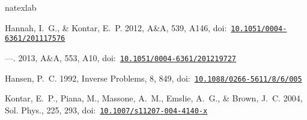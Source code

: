 \documentclass[12pt,a4paper]{article}
\newcommand{\aap}{A\&A}
\newcommand{\solphys}{Sol. Phys.}
\begin{document}
% 
% 	
\begin{thebibliography}{}
\expandafter\ifx\csname natexlab\endcsname\relax\def\natexlab#1{#1}\fi
\providecommand{\url}[1]{\href{#1}{#1}}
\providecommand{\dodoi}[1]{doi:~\href{http://doi.org/#1}{\nolinkurl{#1}}}
\providecommand{\doeprint}[1]{\href{http://ascl.net/#1}{\nolinkurl{http://ascl.net/#1}}}
\providecommand{\doarXiv}[1]{\href{https://arxiv.org/abs/#1}{\nolinkurl{https://arxiv.org/abs/#1}}}

{Hannah}, I.~G., \& {Kontar}, E.~P. 2012, \aap, 539, A146,
  \dodoi{10.1051/0004-6361/201117576}

---. 2013, \aap, 553, A10, \dodoi{10.1051/0004-6361/201219727}

{Hansen}, P.~C. 1992, Inverse Problems, 8, 849,
  \dodoi{10.1088/0266-5611/8/6/005}

{Kontar}, E.~P., {Piana}, M., {Massone}, A.~M., {Emslie}, A.~G., \& {Brown},
  J.~C. 2004, \solphys, 225, 293, \dodoi{10.1007/s11207-004-4140-x}

\end{thebibliography}
\end{document}
